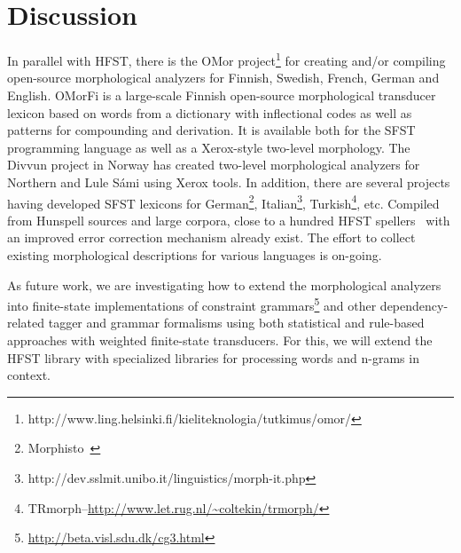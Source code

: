 \documentclass{llncs}
\begin{document}
\section{Discussion}\label{hfst:discussion}
In parallel with HFST, there is the OMor 
project\footnote{http://www.ling.helsinki.fi/kieliteknologia/tutkimus/omor/} for 
creating and/or compiling open-source morphological analyzers for Finnish, Swedish, 
French, German and English. OMorFi is a large-scale Finnish open-source morphological 
transducer lexicon based on words from a dictionary with inflectional codes as well as 
patterns for compounding and derivation. It is available both for the SFST programming 
language as well as a Xerox-style two-level morphology. The Divvun project in Norway 
has created two-level morphological analyzers for Northern and Lule Sámi using 
Xerox tools. In addition, there are several projects having developed SFST lexicons for 
German\footnote{Morphisto~\cite{zielinski/2009}}, 
Italian\footnote{http://dev.sslmit.unibo.it/linguistics/morph-it.php}, Turkish\footnote{TRmorph--\url{http://www.let.rug.nl/~coltekin/trmorph/}}, etc. 
Compiled from Hunspell sources and large corpora, close to a hundred HFST 
spellers~\cite{pirinen/2010/cla} with an improved error correction mechanism 
already exist. The effort to collect existing morphological descriptions
for various languages is on-going.

As future work, we are investigating how to extend the morphological analyzers 
into finite-state implementations of constraint 
grammars\footnote{\url{http://beta.visl.sdu.dk/cg3.html}} and other 
dependency-related tagger and grammar formalisms using both statistical
and rule-based approaches with weighted finite-state transducers. For this, we
will extend the HFST library with specialized libraries for processing
words and n-grams in context.

%
%
%
\end{document}
